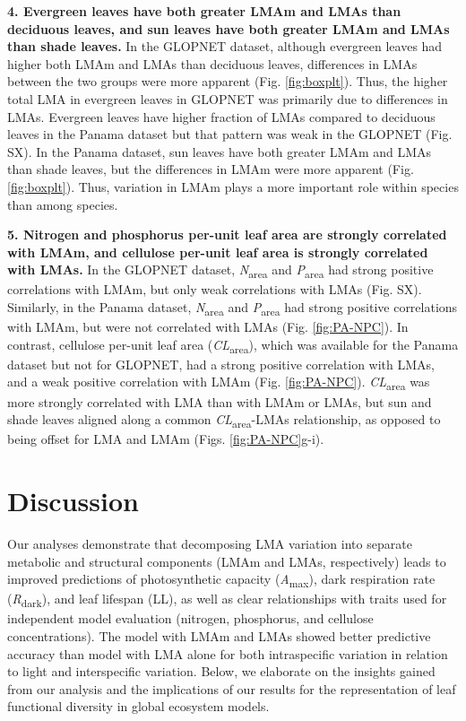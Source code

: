\documentclass[
  12pt,
]{article}
\begin{document}
\textbf{4. Evergreen leaves have both greater LMAm and LMAs than deciduous leaves, and sun leaves have both greater LMAm and LMAs than shade leaves.}
In the GLOPNET dataset, although evergreen leaves had higher both LMAm and LMAs than deciduous leaves, differences in LMAs between the two groups were more apparent (Fig. \ref{fig:boxplt}).
Thus, the higher total LMA in evergreen leaves in GLOPNET was primarily due to differences in LMAs.
Evergreen leaves have higher fraction of LMAs compared to deciduous leaves in the Panama dataset but that pattern was weak in the GLOPNET (Fig. SX).
In the Panama dataset, sun leaves have both greater LMAm and LMAs than shade leaves, but the differences in LMAm were more apparent (Fig. \ref{fig:boxplt}).
Thus, variation in LMAm plays a more important role within species than among species.

\textbf{5. Nitrogen and phosphorus per-unit leaf area are strongly correlated with LMAm, and cellulose per-unit leaf area is strongly correlated with LMAs.}
In the GLOPNET dataset, \emph{N}\textsubscript{area} and \emph{P}\textsubscript{area} had strong positive correlations with LMAm, but only weak correlations with LMAs (Fig. SX).
Similarly, in the Panama dataset, \emph{N}\textsubscript{area} and \emph{P}\textsubscript{area} had strong positive correlations with LMAm, but were not correlated with LMAs (Fig. \ref{fig:PA-NPC}).
In contrast, cellulose per-unit leaf area (\emph{CL}\textsubscript{area}), which was available for the Panama dataset but not for GLOPNET, had a strong positive correlation with LMAs, and a weak positive correlation with LMAm (Fig. \ref{fig:PA-NPC}).
\emph{CL}\textsubscript{area} was more strongly correlated with LMA than with LMAm or LMAs, but sun and shade leaves aligned along a common \emph{CL}\textsubscript{area}-LMAs relationship, as opposed to being offset for LMA and LMAm (Figs. \ref{fig:PA-NPC}g-i).

\hypertarget{discussion}{%
\section{Discussion}\label{discussion}}

Our analyses demonstrate that decomposing LMA variation into separate metabolic and structural components (LMAm and LMAs, respectively) leads to improved predictions of photosynthetic capacity (\emph{A}\textsubscript{max}), dark respiration rate (\emph{R}\textsubscript{dark}), and leaf lifespan (LL), as well as clear relationships with traits used for independent model evaluation (nitrogen, phosphorus, and cellulose concentrations).
The model with LMAm and LMAs showed better predictive accuracy than model with LMA alone for both intraspecific variation in relation to light and interspecific variation.
Below, we elaborate on the insights gained from our analysis and the implications of our results for the representation of leaf functional diversity in global ecosystem models.
\end{document}
